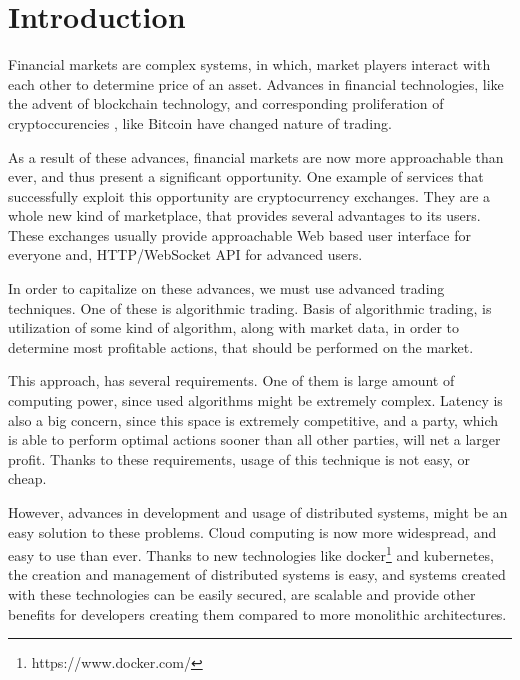 \providecommand*{\listingautorefname}{Code sample}

\newcommand{\trait}[1]{{#1}}

\newcommand{\type}[1]{{#1}}
\newcommand{\fun}[1]{{\texttt{#1}}}
\newcommand{\kubecomp}[1]{{#1}}
\newcommand{\actor}[1]{\textbf{#1}}
\newcommand{\msg}[1]{{#1}}


\chapter{Introduction}
\label{chapter:introduction}
Financial markets are complex systems, in which, market players interact with each other to determine
price of an asset. Advances in financial technologies, like the advent of blockchain technology,
and corresponding proliferation of cryptoccurencies , like Bitcoin\cite{bitcoin} have changed nature of trading.

As a result of these advances, financial markets are now more approachable than ever, and thus present a significant
opportunity. One example of services that successfully exploit this opportunity are cryptocurrency exchanges. They
are a whole new kind of marketplace, that provides several advantages to its users. These exchanges usually provide
approachable Web based user interface for everyone and, HTTP/WebSocket API for advanced users.

In order to capitalize on these advances, we must use advanced trading techniques. One of these is algorithmic
trading. Basis of algorithmic trading, is utilization of some kind of algorithm, along with market data, in
order to determine most profitable actions, that should be performed on the market.

This approach, has several requirements. One of them is large amount of computing power, since used algorithms
might be extremely complex. Latency is also a big concern, since this space is extremely competitive, and a party,
which is able to perform optimal actions sooner than all other parties, will net a larger profit.
Thanks to these requirements, usage of this technique is not easy, or cheap.

However, advances in development and usage of distributed systems, might be an easy solution to these problems.
Cloud computing\cite{wiki:cloud} is now more widespread, and easy to use than ever. Thanks to new technologies like
docker\footnote{https://www.docker.com/} and kubernetes\cite{web:k8s}, the creation and management of distributed systems is easy,
and systems created with these technologies can be easily secured, are scalable and provide other benefits
for developers creating them compared to more monolithic architectures.

